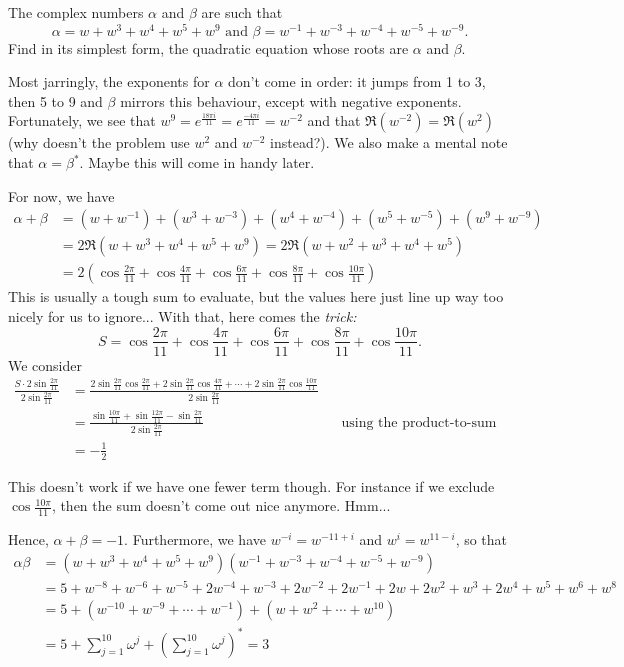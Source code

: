 \documentclass[../main.tex]{subfiles}
\begin{document}
\begin{example}[cont.]
The complex numbers $\alpha$ and $\beta$ are such that
$$\alpha=w+w^3+w^4+w^5+w^9 \text{ and } \beta=w^{-1}+w^{-3}+w^{-4}+w^{-5}+w^{-9}.$$
Find in its simplest form, the quadratic equation whose roots are $\alpha$ and $\beta$.
\end{example}
Most jarringly, the exponents for $\alpha$ don't come in order: it jumps from 1 to 3, then 5 to 9 and $\beta$ mirrors this behaviour, except with negative exponents. Fortunately, we see that $w^9=e^{\frac{18\pi i}{11}}=e^{\frac{-4\pi i}{11}}=w^{-2}$ and that $\Re(w^{-2})=\Re(w^2)$ (why doesn't the problem use $w^2$ and $w^{-2}$ instead?). We also make a mental note that $\alpha=\beta^{*}$. Maybe this will come in handy later.

For now, we have
\begin{align*}
    \alpha+\beta &= (w+w^{-1})+(w^3+w^{-3})+(w^4+w^{-4})+(w^5+w^{-5})+(w^9+w^{-9}) \\
    &= 2\Re(w+w^3+w^4+w^5+w^9) = 2\Re(w+w^2+w^3+w^4+w^5) \\
    &= 2\left(\cos{\frac{2\pi}{11}}+\cos{\frac{4\pi}{11}}+\cos{\frac{6\pi}{11}}+\cos{\frac{8\pi}{11}}+\cos{\frac{10\pi}{11}}\right)
\end{align*}
This is usually a tough sum to evaluate, but the values here just line up way too nicely for us to ignore... With that, here comes the \textit{trick:}  $$S=\cos{\frac{2\pi}{11}}+\cos{\frac{4\pi}{11}}+\cos{\frac{6\pi}{11}}+\cos{\frac{8\pi}{11}}+\cos{\frac{10\pi}{11}}.$$ We consider
\begin{align*}
    \frac{S\cdot2\sin{\frac{2\pi}{11}}}{2\sin{\frac{2\pi}{11}}} &= \frac{2\sin{\frac{2\pi}{11}}\cos{\frac{2\pi}{11}}+2\sin{\frac{2\pi}{11}}\cos{\frac{4\pi}{11}}+\cdots +2\sin{\frac{2\pi}{11}}\cos{\frac{10\pi}{11}}}{2\sin{\frac{2\pi}{11}}}\\
    &= \frac{\sin{\frac{10\pi}{11}}+\sin{\frac{12\pi}{11}}-\sin{\frac{2\pi}{11}}}{2\sin{\frac{2\pi}{11}}} &&\text{using the product-to-sum formula}\\
    &= -\frac{1}{2}
\end{align*}
\begin{remark}
This doesn't work if we have one fewer term though. For instance if we exclude $\cos{\frac{10\pi}{11}}$, then the sum doesn't come out nice anymore. Hmm...
\end{remark}
Hence, $\alpha+\beta=-1$. Furthermore, we have $w^{-i}=w^{-11+i}$ and $w^i=w^{11-i}$, so that
\begin{align*}
    \alpha\beta&=(w+w^3+w^4+w^5+w^9)(w^{-1}+w^{-3}+w^{-4}+w^{-5}+w^{-9}) \\
    &=5+w^{-8}+w^{-6}+w^{-5}+2w^{-4}+w^{-3}+2w^{-2}+2w^{-1}+2w+2w^2+w^3+2w^4+w^5+w^6+w^8 \\
    &=5+(w^{-10}+w^{-9}+\cdots+w^{-1})+(w+w^2+\cdots+w^{10}) \\
    &=5+\sum_{j=1}^{10} \omega^{j}+\left(\sum_{j=1}^{10} \omega^{j}\right)^{*} = 3
\end{align*}
\end{document}
